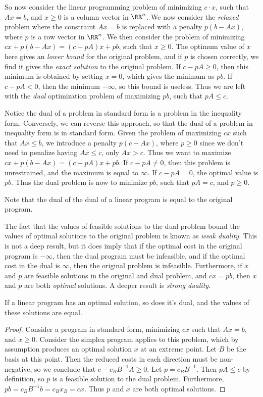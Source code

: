 So now consider the linear programming problem of minimizing $c \cdot x$, such that $Ax = b$, and $x \geq 0$ is a column vector in $\RR^n$. We now consider the \emph{relaxed} problem where the constraint $Ax = b$ is replaced with a penalty $p(b - Ax)$, where $p$ is a row vector in $\RR^n$. We then consider the problem of minimizing $cx + p(b - Ax) = (c - pA)x + pb$, such that $x \geq 0$. The optimum value of $x$ here gives an \emph{lower bound} for the original problem, and if $p$ is chosen correctly, we find it gives the \emph{exact solution} to the original problem. If $c - pA \geq 0$, then this minimum is obtained by setting $x = 0$, which gives the minimum as $pb$. If $c - pA < 0$, then the minimum $-\infty$, so this bound is useless. Thus we are left with the \emph{dual} optimization problem of maximizing $pb$, such that $pA \leq c$.

Notice the dual of a problem in standard form is a problem in the inequality form. Conversely, we can reverse this approach, so that the dual of a problem in inequality form is in standard form. Given the problem of maximizing $cx$ such that $Ax \leq b$, we introduce a penalty $p(c - Ax)$, where $p \geq 0$ since we don't need to penalize having $Ax \leq c$, only $Ax > c$. Thus we want to maximize $cx + p(b - Ax) = (c - pA)x + pb$. If $c - pA \neq 0$, then this problem is unrestrained, and the maximum is equal to $\infty$. If $c - pA = 0$, the optimal value is $pb$. Thus the dual problem is now to minimize $pb$, such that $pA = c$, and $p \geq 0$.

\begin{remark}
    Note that the dual of the dual of a linear program is equal to the original program.
\end{remark}

The fact that the values of feasible solutions to the dual problem bound the values of optimal solutions to the original problem is known as \emph{weak duality}. This is not a deep result, but it does imply that if the optimal cost in the original program is $-\infty$, then the dual program must be infeasible, and if the optimal cost in the dual is $\infty$, then the original problem is infeasible. Furthermore, if $x$ and $p$ are feasible solutions in the original and dual problem, and $cx = pb$, then $x$ and $p$ are both \emph{optimal} solutions. A deeper result is \emph{strong duality}.

\begin{theorem}
    If a linear program has an optimal solution, so does it's dual, and the values of these solutions are equal.
\end{theorem}
\begin{proof}
    Consider a program in standard form, minimizing $cx$ such that $Ax = b$, and $x \geq 0$. Consider the simplex program applies to this problem, which by assumption produces an optimal solution $x$ at an extreme point. Let $B$ be the basis at this point. Then the reduced costs in each direction must be non-negative, so we conclude that $c - c_BB^{-1}A \geq 0$. Let $p = c_BB^{-1}$. Then $pA \leq c$ by definition, so $p$ is a feasible solution to the dual problem. Furthermore, $pb = c_BB^{-1}b = c_Bx_B = cx$. Thus $p$ and $x$ are both optimal solutions.
\end{proof}


